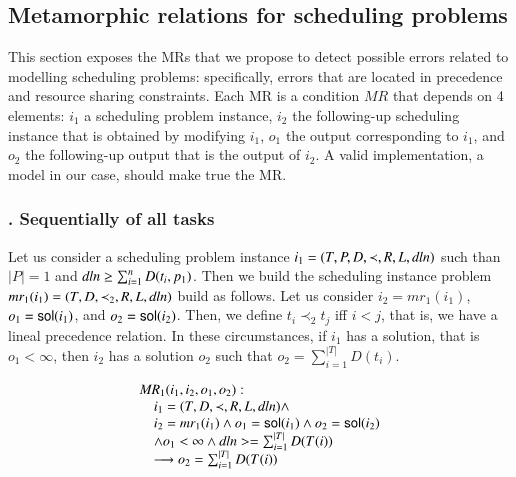 \begin{comment}
\subsubsection{Operador de intercambio: CSWAP}
CSWAP: Este operador intercambia los parámetros 2 y 3, de la función de \texttt{cumulative} de Minizinc.
\end{comment}

\subsection{Metamorphic relations for scheduling problems}
\label{sec:def_MT}


This section exposes the MRs that we propose to detect possible errors
related to modelling scheduling problems: specifically, errors
that are located in precedence and resource sharing
constraints. Each MR is a condition $MR$ that depends
on 4 elements: $i_{1}$ a scheduling problem instance, $i_{2}$ the
following-up scheduling instance that is obtained by modifying
$i_{1}$, $o_{1}$ the output corresponding to $i_{1}$, and $o_{2}$ the
following-up output that is the output of $i_{2}$. A valid
implementation, a model in our case, should make true the MR.

\subsubsection{. Sequentially of all tasks}

Let us consider a scheduling problem instance $i_1 = (T, P, D, \prec, R,
L, \mathit{dln})$ such than $|P|=1$ and $\mathit{dln}\geq\sum_{i=1}^{n}D(t_{i},p_{1})$.
Then we build the scheduling instance problem
$mr_{1}(i_{1})=(T, D, \prec_{2}, R, L, \mathit{dln})$ build as follows. Let us
consider $i_{2}=mr_1(i_{1})$, $o_{1}=\mathsf{sol}(i_{1})$, and
$o_{2}=\mathsf{sol}(i_{2})$.
Then, we define $t_{i}\prec_{2} t_{j}$ iff $i<j$, that is, we have a lineal
precedence relation. In these circumstances, if $i_{1}$ has a
solution, that is $o_{1}<\infty$,
then $i_{2}$ has a solution $o_{2}$ such that
$o_{2}=\sum_{i=1}^{|T|}D(t_{i})$.

\begin{framed}
  \begin{displaymath}
      \begin{array}{l}
        \mathit{MR}_{1}(i_1,i_2,o_{1},o_{2}):\\
        \hskip 1em i_1=(T,D,\prec,R,L,\mathit{dln})\wedge  \\
        \hskip 1em i_2=mr_1(i_1)\wedge o_{1}=\mathsf{sol}(i_{1})\wedge o_{2}=\mathsf{sol}(i_2)\\
      \hskip 1em \wedge o_{1}<\infty\wedge \mathit{dln}>=\sum_{i=1}^{|T|}D(T(i)) \\
      \hskip 1em \longrightarrow o_2 = \sum_{i=1}^{|T|}D(T(i))
    \end{array}
  \end{displaymath}
\end{framed}






